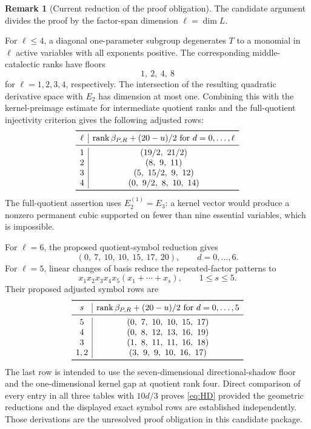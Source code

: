 \documentclass[11pt]{amsart}
\newcommand{\rank}{\operatorname{rank}}
\theoremstyle{definition}
\newtheorem{remark}[theorem]{Remark}
\begin{document}
\begin{remark}[Current reduction of the proof obligation]
The candidate argument divides the proof by the factor-span dimension
\(\ell=\dim L\).

For \(\ell\leq4\), a diagonal one-parameter subgroup degenerates \(T\) to
a monomial in \(\ell\) active variables with all exponents positive.  The
corresponding middle-catalectic ranks have floors
\[
 1,\ 2,\ 4,\ 8
\]
for \(\ell=1,2,3,4\), respectively.  The intersection of the resulting
quadratic derivative space with \(E_2\) has dimension at most one.  Combining
this with the kernel-preimage estimate for intermediate quotient ranks and
the full-quotient injectivity criterion gives the following adjusted rows:
\[
\begin{array}{c|c}
\toprule
\ell & \rank\beta_{P,R}+(20-u)/2\text{ for }d=0,\ldots,\ell\\
\midrule
1&(19/2,\ 21/2)\\
2&(8,\ 9,\ 11)\\
3&(5,\ 15/2,\ 9,\ 12)\\
4&(0,\ 9/2,\ 8,\ 10,\ 14)\\
\bottomrule
\end{array}
\]
The full-quotient assertion uses \(E_2^{(1)}=E_3\): a kernel vector would
produce a nonzero permanent cubic supported on fewer than nine essential
variables, which is impossible.

For \(\ell=6\), the proposed quotient-symbol reduction gives
\begin{equation}\label{eq:ell6-row}
 (0,\ 7,\ 10,\ 10,\ 15,\ 17,\ 20),
 \qquad d=0,\ldots,6.
\end{equation}
For \(\ell=5\), linear changes of basis reduce the repeated-factor patterns
to
\[
 x_1x_2x_3x_4x_5(x_1+\cdots+x_s),\qquad1\leq s\leq5.
\]
Their proposed adjusted symbol rows are
\[
\begin{array}{c|c}
\toprule
s & \rank\beta_{P,R}+(20-u)/2\text{ for }d=0,\ldots,5\\
\midrule
5&(0,\ 7,\ 10,\ 10,\ 15,\ 17)\\
4&(0,\ 8,\ 12,\ 13,\ 16,\ 19)\\
3&(1,\ 8,\ 11,\ 11,\ 16,\ 18)\\
1,2&(3,\ 9,\ 9,\ 10,\ 16,\ 17)\\
\bottomrule
\end{array}
\]
The last row is intended to use the seven-dimensional directional-shadow floor and the
one-dimensional kernel gap at quotient rank four.  Direct comparison of
every entry in all three tables with \(10d/3\) proves \eqref{eq:HD}
provided the geometric reductions and the displayed exact symbol rows are
established independently.  Those derivations are the unresolved proof
obligation in this candidate package.
\end{remark}
\end{document}
